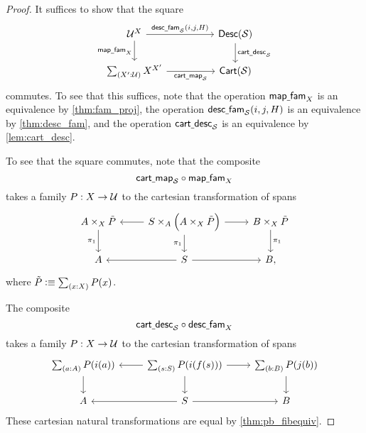 \begin{proof}
It suffices to show that the square
\begin{equation*}
\begin{tikzcd}[column sep=huge]
\UU^X \arrow[r,"{\mathsf{desc\usc{}fam}_{\mathcal{S}}(i,j,H)}"] \arrow[d,swap,"\mathsf{map\usc{}fam}_X"] & \mathsf{Desc}(\mathcal{S}) \arrow[d,"\mathsf{cart\usc{}desc}_{\mathcal{S}}"] \\
\sm{X':\UU}X^{X'} \arrow[r,swap,"\mathsf{cart\usc{}map}_{\mathcal{S}}"] & \mathsf{Cart}(\mathcal{S})
\end{tikzcd}
\end{equation*}
commutes. To see that this suffices, note that the operation $\mathsf{map\underline{\ }{}fam}_X$ is an equivalence by \cref{thm:fam_proj}, the operation $\mathsf{desc\underline{\ }{}fam}_{\mathcal{S}}(i,j,H)$ is an equivalence by \cref{thm:desc_fam}, and the operation $\mathsf{cart\underline{\ }{}desc}_{\mathcal{S}}$ is an equivalence by \cref{lem:cart_desc}.

To see that the square commutes, note that the composite
\begin{equation*}
\mathsf{cart\underline{\ }{}map}_{\mathcal{S}}\circ \mathsf{map\underline{\ }{}fam}_X
\end{equation*}
takes a family $P:X\to \mathcal{U}$ to the cartesian transformation of spans
\begin{equation*}
\begin{tikzcd}
A\times_X\tilde{P} \arrow[d,swap,"\pi_1"] & S\times_A\Big(A\times_X\tilde{P}\Big) \arrow[l] \arrow[r] \arrow[d,swap,"\pi_1"] & B\times_X\tilde{P} \arrow[d,"\pi_1"] \\
A & S \arrow[l] \arrow[r] & B,
\end{tikzcd}
\end{equation*}
where $\tilde{P}\defeq\sm{x:X}P(x)$.

The composite 
\begin{equation*}
\mathsf{cart\underline{\ }{}desc}_{\mathcal{S}}\circ \mathsf{desc\underline{\ }{}fam}_X
\end{equation*}
takes a family $P:X\to \mathcal{U}$ to the cartesian transformation of spans
\begin{equation*}
\begin{tikzcd}
\sm{a:A}P(i(a)) \arrow[d] & \sm{s:S}P(i(f(s))) \arrow[l] \arrow[r] \arrow[d] & \sm{b:B}P(j(b)) \arrow[d] \\
A & S \arrow[l] \arrow[r] & B
\end{tikzcd}
\end{equation*}
These cartesian natural transformations are equal by \cref{thm:pb_fibequiv}.
\end{proof}

